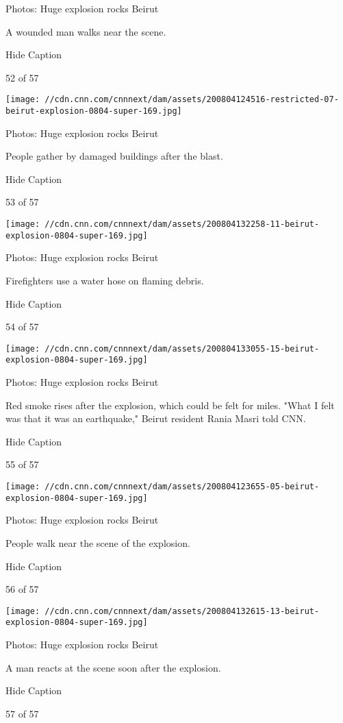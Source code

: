 Photos: Huge explosion rocks Beirut

A wounded man walks near the scene.

Hide Caption

52 of 57

\texttt{[image: //cdn.cnn.com/cnnnext/dam/assets/200804124516-restricted-07-beirut-explosion-0804-super-169.jpg]}

Photos: Huge explosion rocks Beirut

People gather by damaged buildings after the blast.

Hide Caption

53 of 57

\texttt{[image: //cdn.cnn.com/cnnnext/dam/assets/200804132258-11-beirut-explosion-0804-super-169.jpg]}

Photos: Huge explosion rocks Beirut

Firefighters use a water hose on flaming debris.

Hide Caption

54 of 57

\texttt{[image: //cdn.cnn.com/cnnnext/dam/assets/200804133055-15-beirut-explosion-0804-super-169.jpg]}

Photos: Huge explosion rocks Beirut

Red smoke rises after the explosion, which could be felt for miles.
"What I felt was that it was an earthquake," Beirut resident Rania Masri
told CNN.

Hide Caption

55 of 57

\texttt{[image: //cdn.cnn.com/cnnnext/dam/assets/200804123655-05-beirut-explosion-0804-super-169.jpg]}

Photos: Huge explosion rocks Beirut

People walk near the scene of the explosion.

Hide Caption

56 of 57

\texttt{[image: //cdn.cnn.com/cnnnext/dam/assets/200804132615-13-beirut-explosion-0804-super-169.jpg]}

Photos: Huge explosion rocks Beirut

A man reacts at the scene soon after the explosion.

Hide Caption

57 of 57

